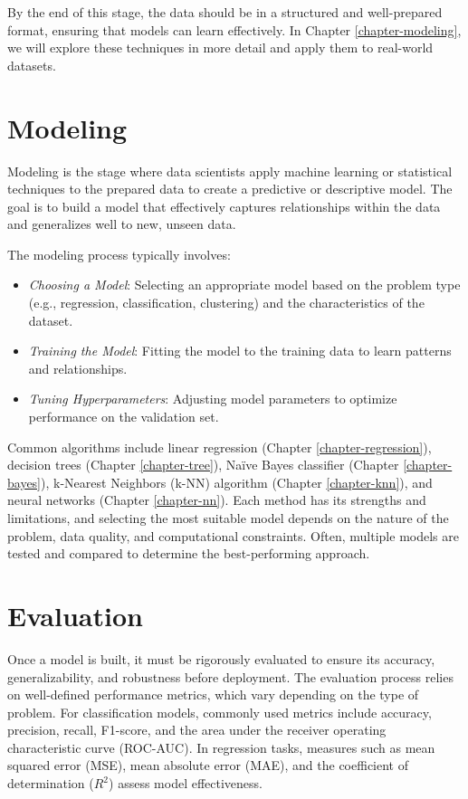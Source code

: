 \documentclass[
]{book}
\providecommand{\tightlist}{%
  \setlength{\itemsep}{0pt}\setlength{\parskip}{0pt}}
\theoremstyle{definition}
\theoremstyle{definition}
\theoremstyle{definition}
\theoremstyle{definition}
\theoremstyle{remark}
\begin{document}
By the end of this stage, the data should be in a structured and well-prepared format, ensuring that models can learn effectively. In Chapter \ref{chapter-modeling}, we will explore these techniques in more detail and apply them to real-world datasets.

\section{Modeling}\label{modeling}

Modeling is the stage where data scientists apply machine learning or statistical techniques to the prepared data to create a predictive or descriptive model. The goal is to build a model that effectively captures relationships within the data and generalizes well to new, unseen data.

The modeling process typically involves:

\begin{itemize}
\tightlist
\item
  \emph{Choosing a Model}: Selecting an appropriate model based on the problem type (e.g., regression, classification, clustering) and the characteristics of the dataset.\\
\item
  \emph{Training the Model}: Fitting the model to the training data to learn patterns and relationships.\\
\item
  \emph{Tuning Hyperparameters}: Adjusting model parameters to optimize performance on the validation set.
\end{itemize}

Common algorithms include linear regression (Chapter \ref{chapter-regression}), decision trees (Chapter \ref{chapter-tree}), Naïve Bayes classifier (Chapter \ref{chapter-bayes}), k-Nearest Neighbors (k-NN) algorithm (Chapter \ref{chapter-knn}), and neural networks (Chapter \ref{chapter-nn}). Each method has its strengths and limitations, and selecting the most suitable model depends on the nature of the problem, data quality, and computational constraints. Often, multiple models are tested and compared to determine the best-performing approach.

\section{Evaluation}\label{evaluation}

Once a model is built, it must be rigorously evaluated to ensure its accuracy, generalizability, and robustness before deployment. The evaluation process relies on well-defined performance metrics, which vary depending on the type of problem. For classification models, commonly used metrics include accuracy, precision, recall, F1-score, and the area under the receiver operating characteristic curve (ROC-AUC). In regression tasks, measures such as mean squared error (MSE), mean absolute error (MAE), and the coefficient of determination (\(R^2\)) assess model effectiveness.
\end{document}
